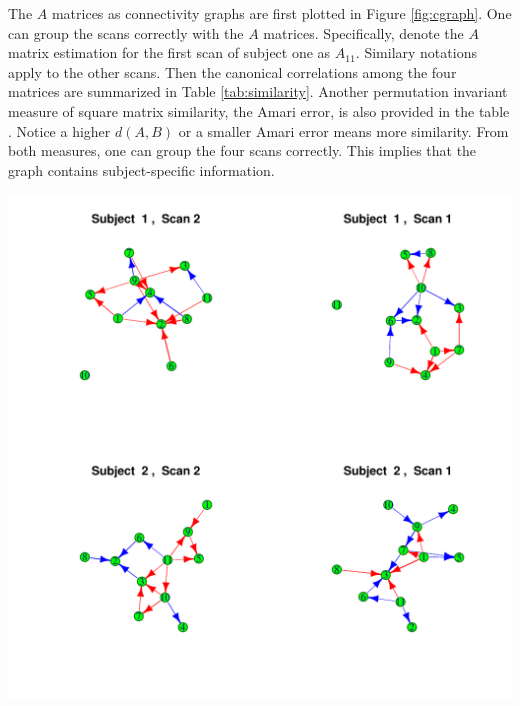 \documentclass[fleqn]{article}
\let\oldref\ref
\renewcommand{\ref}[1]{(\oldref{#1})}
\begin{document}
The $A$ matrices as connectivity graphs are first plotted in Figure \oldref{fig:cgraph}. One can group the scans correctly with the $A$ matrices. Specifically, denote the $A$ matrix estimation for the first scan of subject one as $A_{11}$. Similary notations apply to the other scans. Then the canonical correlations among the four matrices are summarized in Table \oldref{tab:similarity}. Another permutation invariant measure of square matrix similarity, the Amari error, is also provided in the table \cite{amari1996new}. Notice a higher $d(A,B)$ or a smaller Amari error means more similarity. From both measures, one can group the four scans correctly. This implies that the graph contains subject-specific information.
\begin{center}
\includegraphics[scale = 0.85]{./figures/ConnectivityGraph_11_all.pdf}
\label{fig:cgraph}
\end{center}

\end{document}
